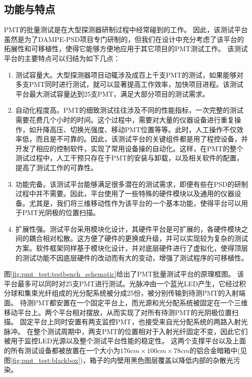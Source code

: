 \subsection{功能与特点}
\label{sec:pmt_test:testbench_functions}
PMT的批量测试是在大型探测器研制过程中经常碰到的工作。
因此，该测试平台虽然是为了DAMPE-PSD项目专门研制的，但我们在设计中充分考虑了该平台的拓展性和可移植性，使得它能够方便地应用于其它项目的PMT测试工作。
该测试平台的主要特点可以归结为如下几点：
\begin{enumerate}
	\item 测试容量大。大型探测器项目动辄涉及成百上千支PMT的测试，如果能够对多支PMT同时进行测试，就可以显著提高工作效率，加快项目进程。该测试平台最大测试容量达到25支PMT，满足大部分项目的测试需求。
	\item 自动化程度高。PMT的细致测试往往涉及不同的性能指标，一次完整的测试需要花费几个小时的时间。这个过程中，需要对大量的仪器设备进行重复操作，如升降高压、切换光强度、移动PMT位置等等。此时，人工操作不仅效率低，而且是不可靠的。因此，该测试平台的关键组件都是用了程控设备，并开发了相应的控制软件，实现了常用设备操的自动化。这样，在PMT的整个测试过程中，人工干预只存在于PMT的安装与卸载，以及相关软件的配置，提高了测试工作的可靠性。
	\item 功能完备。该测试平台能够满足很多潜在的测试需求，即便有些在PSD的研制过程中并不需要。因此，平台使用了一些特殊的硬件模块以及通用的仪器设备。尤其是，我们将三维移动性作为该平台的一个基本功能，使得平台可以用于PMT光阴极的位置扫描。
	\item 扩展性强。测试平台采用模块化设计，其硬件平台是可扩展的，各硬件模块之间的耦合相对松散。这方便了硬件的更换或升级，并可以实现较为复杂的测试方案。软件框架同样基于模块化设计，并对底层硬件进行了虚拟化，使得顶层的测试功能不因底层硬件的改动而有大的变动，增强了测试程序的可移植性。
\end{enumerate}

图\ref{fig:pmt_test:testbench_schematic}给出了PMT批量测试平台的原理框图。
该平台最多可以同时对25支PMT进行测试。光脉冲由一个蓝光LED产生，它经过积分球和集束光纤组成的光分配系统被分成25份，被分别传输到待测PMT的入射端面。
待测PMT都安置在一个固定平台上，而光源和光分配系统被固定在一个三维移动平台上。两个平台相对摆放，从而实现了对所有待测PMT的光阴极位置扫描。
固定平台上同时安置有两支监控PMT，也接受来自光分配系统的两路入射光脉冲。
在整个测试周期中，两支PMT的位置相对于入射光纤固定不变，因此它们被用于监控LED光源以及整个测试平台性能的稳定性。
这两个支撑平台以及上面的所有测试设备都被放置在一个大小为$176cm\times100cm\times78cm$的铝合金暗箱中(见图\ref{fig:pmt_test:blackbox})，箱子的内壁用黑色图层覆盖以降低内部的杂散光污染。

